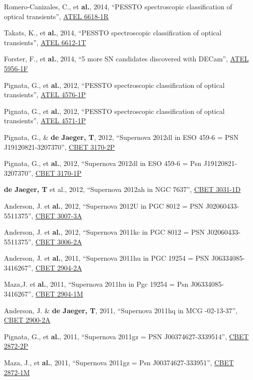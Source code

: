 \documentclass[12pt]{article}
\begin{document}
\begin{bibenum}
    \item Romero-Canizales, C., et \textbf{al.}, 2014, ``PESSTO spectroscopic classification of optical transients'', \href{http://adsabs.harvard.edu/abs/2014ATel.6618....1R}{ATEL 6618-1R}
    \item Takats, K., et \textbf{al.}, 2014, ``PESSTO spectroscopic classification of optical transients'', \href{http://adsabs.harvard.edu/abs/2014ATel.6612....1T}{ATEL 6612-1T}
    \item Forster, F., et \textbf{al.}, 2014, ``5 more SN candidates discovered with DECam'', \href{http://adsabs.harvard.edu/abs/2014ATel.5956....1F}{ATEL 5956-1F}
    \item Pignata, G., et \textbf{al.}, 2012, ``PESSTO spectroscopic classification of optical transients'', \href{http://adsabs.harvard.edu/abs/2012ATel.4576....1P}{ATEL 4576-1P}
    \item Pignata, G., et \textbf{al.}, 2012, ``PESSTO spectroscopic classification of optical transients'', \href{http://adsabs.harvard.edu/abs/2012ATel.4571....1P}{ATEL 4571-1P}
    \item Pignata, G., \& \textbf{de Jaeger, T}, 2012, ``Supernova 2012dl in ESO 459-6 = PSN J19120821-3207370'', \href{http://adsabs.harvard.edu/abs/2012CBET.3170....2P}{CBET 3170-2P}
    \item Pignata, G., et \textbf{al.}, 2012, ``Supernova 2012dl in ESO 459-6 = Psn J19120821-3207370'', \href{http://adsabs.harvard.edu/abs/2012CBET.3170....1P}{CBET 3170-1P}
    \item \textbf{de Jaeger, T} et al., 2012, ``Supernova 2012ah in NGC 7637'', \href{http://adsabs.harvard.edu/abs/2012CBET.3031....1D}{CBET 3031-1D}
    \item Anderson, J. et \textbf{al.}, 2012, ``Supernova 2012U in PGC 8012 = PSN J02060433-5511375'', \href{http://adsabs.harvard.edu/abs/2012CBET.3007....3A}{CBET 3007-3A}
    \item Anderson, J. et \textbf{al.}, 2012, ``Supernova 2011kc in PGC 8012 = PSN J02060433-5511375'', \href{http://adsabs.harvard.edu/abs/2012CBET.3006....2A}{CBET 3006-2A}
    \item Anderson, J. et \textbf{al.}, 2011, ``Supernova 2011hu in PGC 19254 = PSN J06334085-3416267'', \href{http://adsabs.harvard.edu/abs/2011CBET.2904....2A}{CBET 2904-2A}
    \item Maza,J. et \textbf{al.}, 2011, ``Supernova 2011hu in Pgc 19254 = Psn J06334085-3416267'', \href{http://adsabs.harvard.edu/abs/2011CBET.2904....1M}{CBET 2904-1M}
    \item Anderson, J. \& \textbf{de Jaeger, T}, 2011, ``Supernova 2011hq in MCG -02-13-37'', \href{http://adsabs.harvard.edu/abs/2011CBET.2900....2A}{CBET 2900-2A}
    \item Pignata, G., et \textbf{al.}, 2011, ``Supernova 2011gz = PSN J00374627-3339514'', \href{http://adsabs.harvard.edu/abs/2011CBET.2872....2P}{CBET 2872-2P}
    \item Maza, J., et \textbf{al.}, 2011, ``Supernova 2011gz = Psn J00374627-333951'', \href{http://adsabs.harvard.edu/abs/2011CBET.2872....1M}{CBET 2872-1M\\} 

\end{bibenum}
\end{document}
